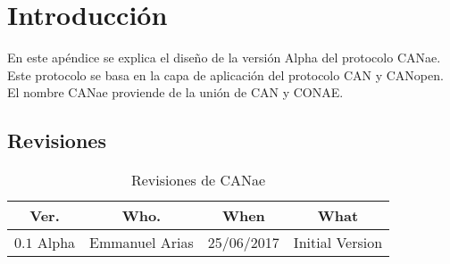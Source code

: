 \section{Introducción}
En este apéndice se explica el diseño de la versión Alpha del
protocolo CANae. Este protocolo se basa en la capa de
aplicación del protocolo CAN y CANopen. El nombre CANae proviende de
la unión de CAN y CONAE. 

\subsection{Revisiones}
\begin{table}[H]
  \centering
  \caption{Revisiones de CANae}
  \label{table:revisiones_canae}
  \begin{tabular}{|p{1cm}|p{2cm}|p{2cm}|p{5cm}|}
  \hline
  \multicolumn{1}{|c|}{\textbf{Ver.}} & \multicolumn{1}{c|}{\textbf{Who.}} & \multicolumn{1}{c|}{\textbf{When}} & \multicolumn{1}{c|}{\textbf{What}} \\ \hline \hline
 $0.1$ Alpha & Emmanuel Arias & 25/06/2017 & Initial Version \\ \hline
  \end{tabular}
\end{table}
\newpage

